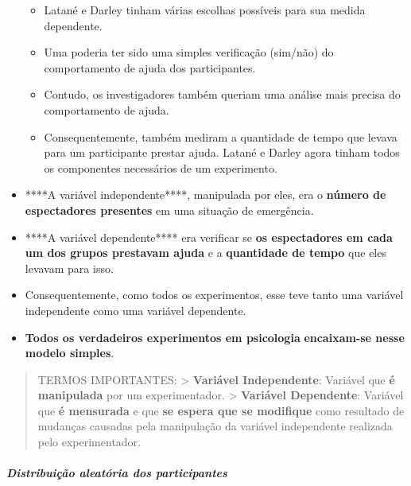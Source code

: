 \documentclass[
]{book}
\providecommand{\tightlist}{%
  \setlength{\itemsep}{0pt}\setlength{\parskip}{0pt}}
\begin{document}
\begin{itemize}
  \begin{itemize}
  \tightlist
  \item
    Latané e Darley tinham várias escolhas possíveis para sua medida
    dependente.
  \item
    Uma poderia ter sido uma simples verificação (sim/não) do
    comportamento de ajuda dos participantes.
  \item
    Contudo, os investigadores também queriam uma análise mais precisa
    do comportamento de ajuda.
  \item
    Consequentemente, também mediram a quantidade de tempo que levava
    para um participante prestar ajuda. Latané e Darley agora tinham
    todos os componentes necessários de um experimento.
  \end{itemize}
\item
  ****A variável independente****, manipulada por eles, era o
  \textbf{número de espectadores presentes} em uma situação de
  emergência.
\item
  ****A variável dependente**** era verificar se \textbf{os espectadores
  em cada um dos grupos prestavam ajuda} e a \textbf{quantidade de
  tempo} que eles levavam para isso.
\item
  Consequentemente, como todos os experimentos, esse teve tanto uma
  variável independente como uma variável dependente.
\item
  \textbf{Todos os verdadeiros experimentos em psicologia}
  \textbf{encaixam-se nesse modelo simples}.
\end{itemize}

\begin{quote}
TERMOS IMPORTANTES: \textgreater{} \textbf{Variável Independente}:
Variável que \textbf{é manipulada} por um experimentador. \textgreater{}
\textbf{Variável Dependente}: Variável que \textbf{é mensurada }e que
\textbf{se espera que se modifique} como resultado de mudanças causadas
pela manipulação da variável independente realizada pelo experimentador.
\end{quote}

\hypertarget{distribuiuxe7uxe3o-aleatuxf3ria-dos-participantes}{%
\subparagraph{Distribuição aleatória dos
participantes}\label{distribuiuxe7uxe3o-aleatuxf3ria-dos-participantes}}
\end{document}
